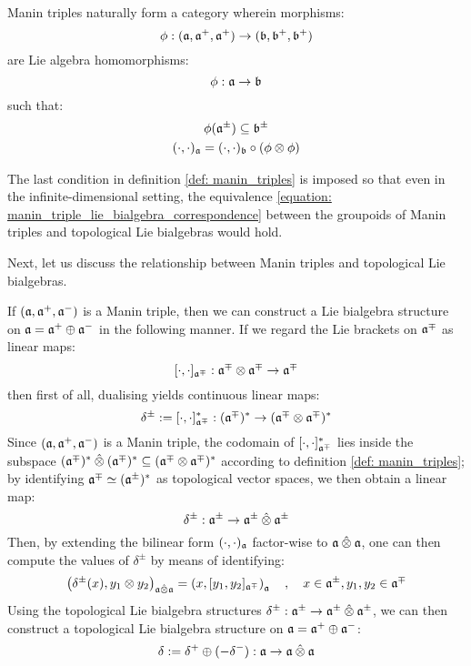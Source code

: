 Manin triples naturally form a category wherein morphisms:
    $$\phi: (\mathfrak{a}, \mathfrak{a}^+, \mathfrak{a}^+) \to (\mathfrak{b}, \mathfrak{b}^+, \mathfrak{b}^+)$$
are Lie algebra homomorphisms:
    $$\phi: \mathfrak{a} \to \mathfrak{b}$$
such that:
    \begin{equation} \label{equation: morphisms_of_manin_triples}
        \begin{gathered}
            \phi( \a^{\pm} ) \subseteq \b^{\pm}
            \\
            (\cdot, \cdot)_{\a} = (\cdot, \cdot)_{\b} \circ (\phi \tensor \phi)
        \end{gathered}
    \end{equation}
\begin{remark}
    The last condition in definition \ref{def: manin_triples} is imposed so that even in the infinite-dimensional setting, the equivalence \eqref{equation: manin_triple_lie_bialgebra_correspondence} between the groupoids of Manin triples and topological Lie bialgebras would hold.
\end{remark}

Next, let us discuss the relationship between Manin triples and topological Lie bialgebras.

If $(\mathfrak{a}, \mathfrak{a}^+, \mathfrak{a}^-)$ is a Manin triple, then we can construct a Lie bialgebra structure on $\mathfrak{a} = \mathfrak{a}^+ \oplus \mathfrak{a}^-$ in the following manner. If we regard the Lie brackets on $\mathfrak{a}^{\mp}$ as linear maps:
    $$[\cdot, \cdot]_{\a^{\mp}}: \a^{\mp} \tensor \a^{\mp} \to \a^{\mp}$$
then first of all, dualising yields continuous linear maps:
    \begin{equation} \label{equation: dual_of_lie_brackets}
        \delta^{\pm} := [\cdot, \cdot]_{\a^{\mp}}^*: (\a^{\mp})^{*} \to (\a^{\mp} \tensor \a^{\mp})^*
    \end{equation}
Since $(\mathfrak{a}, \mathfrak{a}^+, \mathfrak{a}^-)$ is a Manin triple, the codomain of $[\cdot, \cdot]_{\mathfrak{a}^{\mp}}^*$ lies inside the subspace $(\a^{\mp})^{*} \hattensor (\a^{\mp})^{*} \subseteq (\a^{\mp} \tensor \a^{\mp})^*$ according to definition \ref{def: manin_triples}; by identifying $\mathfrak{a}^{\mp} \simeq (\mathfrak{a}^{\pm})^*$ as topological vector spaces, we then obtain a linear map:
    $$\delta^{\pm}: \a^{\pm} \to \a^{\pm} \hattensor \a^{\pm}$$
Then, by extending the bilinear form $(\cdot, \cdot)_{\mathfrak{a}}$ factor-wise to $\a \hattensor \a$, one can then compute the values of $\delta^{\pm}$ by means of identifying:
    \begin{equation} \label{equation: lie_cobrackets_by_duality}
        \left( \delta^{\pm}(x), y_1 \tensor y_2 \right)_{\a \hattensor \a} = \left( x, [y_1, y_2]_{\a^{\mp}} \right)_{\a} \quad, \quad x \in \a^{\pm}, y_1, y_2 \in \a^{\mp}
    \end{equation}
Using the topological Lie bialgebra structures $\delta^{\pm}: \a^{\pm} \to \a^{\pm} \hattensor \a^{\pm}$, we can then construct a topological Lie bialgebra structure on $\mathfrak{a} = \mathfrak{a}^+ \oplus \mathfrak{a}^-$:
    $$\delta := \delta^+ \oplus (-\delta^-): \a \to \a \hattensor \a$$

